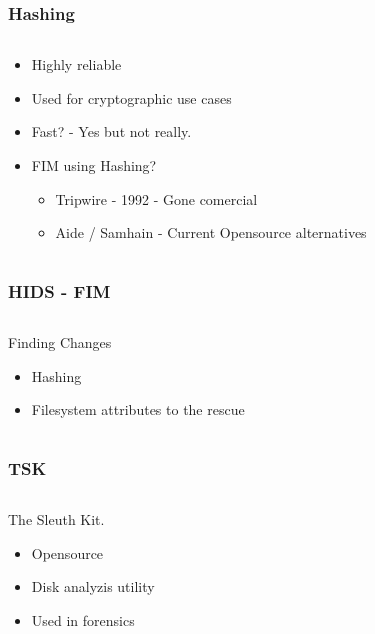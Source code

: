 \documentclass{beamer}
\begin{document}
\begin{frame}[fragile]
  \frametitle{Hashing}
  \begin{columns}
    \begin{column}{1\textwidth}
      \begin{itemize}
        \item Highly reliable
        \item Used for cryptographic use cases
        \item Fast? \pause - Yes but not really.
        \item FIM using Hashing?
        \begin{itemize}
          \item Tripwire - 1992 - Gone comercial
          \item Aide / Samhain - Current Opensource alternatives
        \end{itemize}
      \end{itemize}
    \end{column}
  \end{columns}
\end{frame}


\begin{frame}[fragile]
  \frametitle{HIDS - FIM}
  \begin{columns}
    \begin{column}{1\textwidth}
      Finding Changes
      \begin{itemize}
        \item Hashing
        \item Filesystem attributes to the rescue
      \end{itemize}
    \end{column}
  \end{columns}
\end{frame}

\begin{frame}[fragile]
  \frametitle{TSK}
  \begin{columns}
    \begin{column}{1\textwidth}
      The Sleuth Kit.
      \begin{itemize}
        \item Opensource
        \item Disk analyzis utility
        \item Used in forensics
      \end{itemize}
    \end{column}
  \end{columns}
\end{frame}
\end{document}
